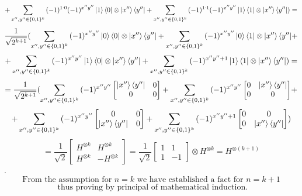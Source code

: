 \documentclass{article}
\begin{document}
\begin{framed}
$$    $$
    $$
    + \sum_{x'',y''\in\{0,1\}^k}{(-1)^{1 \cdot 0}(-1)^{x''y''}\ket{1}\bra{0} \otimes \ket{x''}\bra{y''}} + \sum_{x'',y''\in\{0,1\}^k}{(-1)^{1 \cdot 1}(-1)^{x''y''}\ket{1}\bra{1} \otimes \ket{x''}\bra{y''}} ) = 
    $$
    $$
    \frac{1}{\sqrt{2^{k+1}}}(\sum_{x'',y''\in\{0,1\}^k}{(-1)^{x''y''}\ket{0}\bra{0} \otimes \ket{x''}\bra{y''}} + \sum_{x'',y''\in\{0,1\}^k}{(-1)^{x''y''}\ket{0}\bra{1} \otimes \ket{x''}\bra{y''}} +
    $$
    $$
    + \sum_{x'',y''\in\{0,1\}^k}{(-1)^{x''y''}\ket{1}\bra{0} \otimes \ket{x''}\bra{y''}} + \sum_{x'',y''\in\{0,1\}^k}{(-1)^{x''y'' + 1}\ket{1}\bra{1} \otimes \ket{x''}\bra{y''}} \space \space) = 
    $$
    $$
    = \frac{1}{\sqrt{2^{k+1}}}(\sum_{x'',y''\in\{0,1\}^k}{(-1)^{x''y''}\begin{bmatrix}\ket{x''}\bra{y''} & 0 \\ 0 & 0\end{bmatrix}} + \sum_{x'',y''\in\{0,1\}^k}{(-1)^{x''y''}\begin{bmatrix}0 & \ket{x''}\bra{y''} \\ 0 & 0\end{bmatrix}} + 
    $$
    $$
    + \sum_{x'',y''\in\{0,1\}^k}{(-1)^{x''y''}\begin{bmatrix}0 & 0 \\ \ket{x''}\bra{y''} & 0\end{bmatrix}} + \sum_{x'',y''\in\{0,1\}^k}{(-1)^{x''y''+1}\begin{bmatrix}0 & 0 \\ 0 & \ket{x''}\bra{y''}\end{bmatrix}} \space \space)
    $$
    $$
    = \frac{1}{\sqrt{2}}\begin{bmatrix}H^{\otimes k} & H^{\otimes k} \\ H^{\otimes k} & -H^{\otimes k}\end{bmatrix} = \frac{1}{\sqrt{2}}\begin{bmatrix}1 & 1 \\ 1 & -1\end{bmatrix} \otimes H^{\otimes k} = H^{\otimes (k+1)}
    $$.
    $$
    \text{From the assumption for } n = k \text{ we have established a fact for } n = k + 1 
    $$
    $$
    \text{ thus proving by principal of mathematical induction}.
    $$
    


\end{framed}

\bigskip
\end{document}
